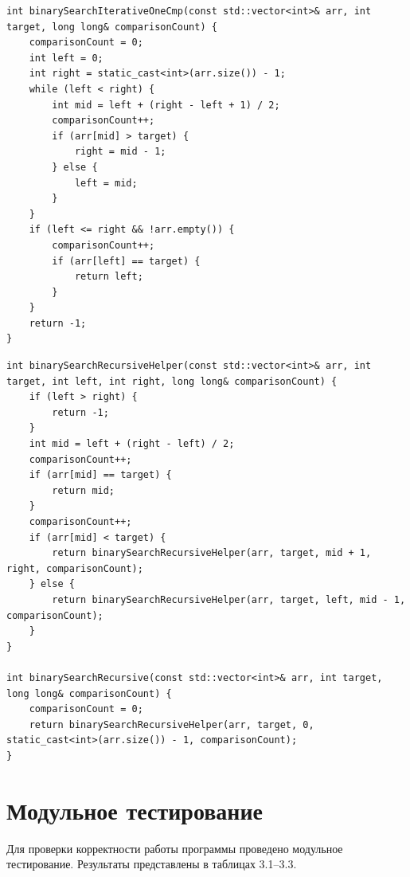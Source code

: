 \documentclass[14pt,a4paper]{extarticle}
\begin{document}
\clearpage
\noindent\begin{minipage}{\linewidth}
\begin{lstlisting}[caption={Реализация нерекурсивного алгоритма бинарного поиска с одним сравнением},label={lst:one}]
int binarySearchIterativeOneCmp(const std::vector<int>& arr, int target, long long& comparisonCount) {
    comparisonCount = 0;
    int left = 0;
    int right = static_cast<int>(arr.size()) - 1;
    while (left < right) {
        int mid = left + (right - left + 1) / 2;
        comparisonCount++;
        if (arr[mid] > target) {
            right = mid - 1;
        } else {
            left = mid;
        }
    }
    if (left <= right && !arr.empty()) {
        comparisonCount++;
        if (arr[left] == target) {
            return left;
        }
    }
    return -1;
}
\end{lstlisting}
\end{minipage}

\medskip
\noindent\begin{minipage}{\linewidth}
\begin{lstlisting}[caption={Реализация рекурсивного алгоритма бинарного поиска},label={lst:recursive}]
int binarySearchRecursiveHelper(const std::vector<int>& arr, int target, int left, int right, long long& comparisonCount) {
    if (left > right) {
        return -1;
    }
    int mid = left + (right - left) / 2;
    comparisonCount++;
    if (arr[mid] == target) {
        return mid;
    }
    comparisonCount++;
    if (arr[mid] < target) {
        return binarySearchRecursiveHelper(arr, target, mid + 1, right, comparisonCount);
    } else {
        return binarySearchRecursiveHelper(arr, target, left, mid - 1, comparisonCount);
    }
}

int binarySearchRecursive(const std::vector<int>& arr, int target, long long& comparisonCount) {
    comparisonCount = 0;
    return binarySearchRecursiveHelper(arr, target, 0, static_cast<int>(arr.size()) - 1, comparisonCount);
}
\end{lstlisting}
\end{minipage}

\clearpage\section{Модульное тестирование}
\label{sec:testing}
Для проверки корректности работы программы проведено модульное тестирование. Результаты представлены в таблицах 3.1--3.3.
\end{document}
